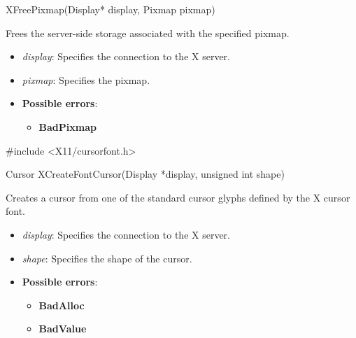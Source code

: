 \documentclass{report}
\begin{document}
\begin{itemize}
            \begin{cppcode}
                XFreePixmap(Display* display, Pixmap pixmap)
            \end{cppcode}
            \bigbreak \noindent
            Frees the server-side storage associated with the specified pixmap.

            \begin{itemize}
                \item \textit{display}: Specifies the connection to the X server.
                \item \textit{pixmap}: Specifies the pixmap.
            \end{itemize}

            \begin{itemize}
                \item \textbf{Possible errors}:
                    \begin{itemize}
                        \item \textbf{BadPixmap}
                    \end{itemize}
            \end{itemize}

            \begin{cppcode}
                #include <X11/cursorfont.h>

                Cursor XCreateFontCursor(Display *display, unsigned int shape)
            \end{cppcode}
            \bigbreak \noindent
            Creates a cursor from one of the standard cursor glyphs defined by the X cursor font.

            \begin{itemize}
                \item \textit{display}: Specifies the connection to the X server.
                \item \textit{shape}: Specifies the shape of the cursor.
            \end{itemize}

            \begin{itemize}
                \item \textbf{Possible errors}:
                    \begin{itemize}
                        \item \textbf{BadAlloc}
                        \item \textbf{BadValue}
                    \end{itemize}
            \end{itemize}


\end{itemize}
\end{document}
